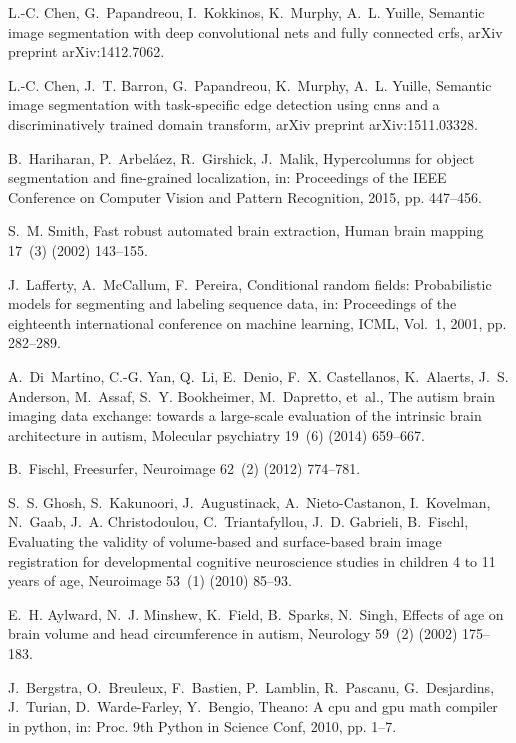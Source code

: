 \documentclass[twoside,fleqn,espcrc2]{elsarticle}
\begin{document}
\begin{thebibliography}{10}
L.-C. Chen, G.~Papandreou, I.~Kokkinos, K.~Murphy, A.~L. Yuille, Semantic image
  segmentation with deep convolutional nets and fully connected crfs, arXiv
  preprint arXiv:1412.7062.

L.-C. Chen, J.~T. Barron, G.~Papandreou, K.~Murphy, A.~L. Yuille, Semantic
  image segmentation with task-specific edge detection using cnns and a
  discriminatively trained domain transform, arXiv preprint arXiv:1511.03328.

B.~Hariharan, P.~Arbel{\'a}ez, R.~Girshick, J.~Malik, Hypercolumns for object
  segmentation and fine-grained localization, in: Proceedings of the IEEE
  Conference on Computer Vision and Pattern Recognition, 2015, pp. 447--456.

S.~M. Smith, Fast robust automated brain extraction, Human brain mapping 17~(3)
  (2002) 143--155.

J.~Lafferty, A.~McCallum, F.~Pereira, Conditional random fields: Probabilistic
  models for segmenting and labeling sequence data, in: Proceedings of the
  eighteenth international conference on machine learning, ICML, Vol.~1, 2001,
  pp. 282--289.

A.~Di~Martino, C.-G. Yan, Q.~Li, E.~Denio, F.~X. Castellanos, K.~Alaerts, J.~S.
  Anderson, M.~Assaf, S.~Y. Bookheimer, M.~Dapretto, et~al., The autism brain
  imaging data exchange: towards a large-scale evaluation of the intrinsic
  brain architecture in autism, Molecular psychiatry 19~(6) (2014) 659--667.

B.~Fischl, Freesurfer, Neuroimage 62~(2) (2012) 774--781.

S.~S. Ghosh, S.~Kakunoori, J.~Augustinack, A.~Nieto-Castanon, I.~Kovelman,
  N.~Gaab, J.~A. Christodoulou, C.~Triantafyllou, J.~D. Gabrieli, B.~Fischl,
  Evaluating the validity of volume-based and surface-based brain image
  registration for developmental cognitive neuroscience studies in children 4
  to 11 years of age, Neuroimage 53~(1) (2010) 85--93.

E.~H. Aylward, N.~J. Minshew, K.~Field, B.~Sparks, N.~Singh, Effects of age on
  brain volume and head circumference in autism, Neurology 59~(2) (2002)
  175--183.

J.~Bergstra, O.~Breuleux, F.~Bastien, P.~Lamblin, R.~Pascanu, G.~Desjardins,
  J.~Turian, D.~Warde-Farley, Y.~Bengio, Theano: A cpu and gpu math compiler in
  python, in: Proc. 9th Python in Science Conf, 2010, pp. 1--7.


\end{thebibliography}
\end{document}
